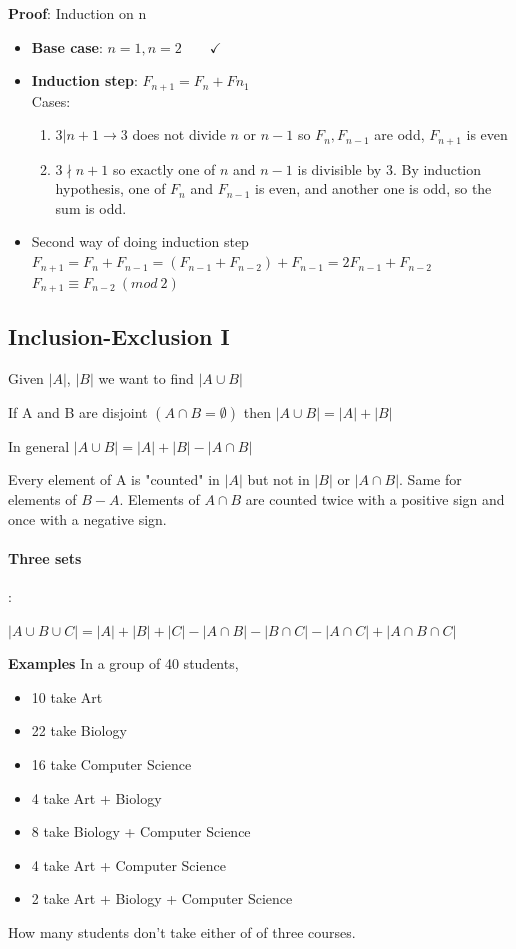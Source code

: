 \documentclass[9pt, letterpaper, oneside]{article}
\begin{document}
\textbf{Proof}: Induction on n
\begin{itemize}
\item \textbf{Base case}: $n = 1, n = 2 \qquad \checkmark$
\item \textbf{Induction step}: $F_{n+1} = F_{n} + F{n_1}$\\
Cases:
    \begin{enumerate}
        \item $3|n+1 \to 3$ does not divide $n$ or $n-1$ so $F_n, F_{n-1}$ are odd, $F_{n+1}$ is even
        \item $3 \nmid n + 1$ so exactly one of $n$ and $n-1$ is divisible by 3. By induction hypothesis, one of $F_n$ and $F_{n-1}$ is even, and another one is odd, so the sum is odd.
    \end{enumerate}
\item Second way of doing induction step
$F_{n+1} = F_n + F_{n-1} = (F_{n-1} + F_{n-2}) + F_{n-1} = 2F_{n-1} + F_{n-2}$
$F_{n+1} \equiv F_{n-2} \ (mod \ 2)$
\end{itemize}

\subsection{Inclusion-Exclusion I}

Given $| A |$, $| B |$ we want to find $|A \cup B|$  

If A and B are disjoint $(A \cap B = \emptyset)$ then $|A \cup B| = |A| + |B|$

In general $|A \cup B| = | A | + | B | - | A \cap B |$

Every element of A is "counted" in $| A |$ but not in $| B |$ or $| A \cap B |$.
Same for elements of $B - A$. Elements of $A \cap B$ are counted twice with a positive sign and once with a negative sign.

\paragraph{Three sets}:

$| A \cup B \cup C | = | A | + | B | + | C | - | A \cap B | - | B \cap C | - | A \cap C | + | A \cap B \cap C |$

\textbf{Examples}
In a group of 40 students, 
\begin{itemize}
\item 10 take Art
\item 22 take Biology
\item 16 take Computer Science
\item 4 take Art + Biology
\item 8 take Biology + Computer Science %
\item 4 take Art + Computer Science
\item 2 take Art + Biology + Computer Science
\end{itemize}
How many students don't take either of  of three courses.
\end{document}
